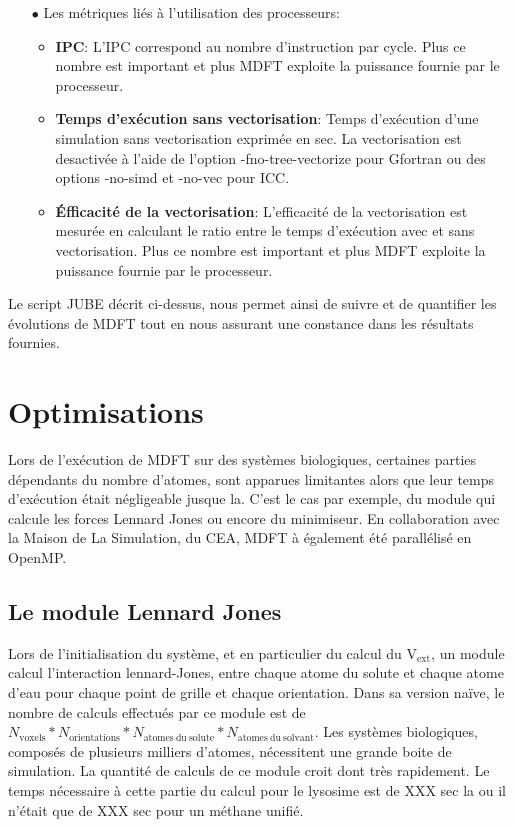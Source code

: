 \begin{itemize}
\item[$\bullet$] Les métriques liés à l'utilisation des processeurs:
  \begin{itemize}
  \item \textbf{IPC}: L'IPC correspond au nombre d'instruction par cycle. Plus ce nombre est important et plus MDFT exploite la puissance fournie par le processeur.
  \item \textbf{Temps d'exécution sans vectorisation}: Temps d’exécution d'une simulation sans vectorisation exprimée en sec. La vectorisation est desactivée à l'aide de l'option -fno-tree-vectorize pour Gfortran ou des options -no-simd et -no-vec pour ICC. 
  \item \textbf{\'Efficacité de la vectorisation}: L'efficacité de la vectorisation est mesurée en calculant le ratio entre le temps d'exécution avec et sans vectorisation. Plus ce nombre est important et plus MDFT exploite la puissance fournie par le processeur.
  \end{itemize}
  \vspace*{1.5ex}%

\end{itemize}

Le script JUBE décrit ci-dessus, nous permet ainsi de suivre et de quantifier les évolutions de MDFT tout en nous assurant une constance dans les résultats fournies.



\section{Optimisations}
Lors de l'exécution de MDFT sur des systèmes biologiques, certaines parties dépendants du nombre d'atomes, sont apparues limitantes alors que leur temps d'exécution était négligeable jusque la. C'est le cas par exemple, du module qui calcule les forces Lennard Jones ou encore du minimiseur. En collaboration avec la Maison de La Simulation, du CEA, MDFT à également été parallélisé en OpenMP.


\subsection{Le module Lennard Jones}
Lors de l’initialisation du système, et en particulier du calcul du $\mathrm{V}_\mathrm{ext}$, un module calcul l’interaction lennard-Jones, entre chaque atome du solute et chaque atome d'eau pour chaque point de grille et chaque orientation. Dans sa version naïve, le nombre de calculs effectués par ce module est de $N_{\mathrm{voxels}}*N_{\mathrm{orientations}}*N_{\mathrm{atomes\ du\ solute}}*N_{\mathrm{atomes\ du\ solvant}}$. Les systèmes biologiques, composés de plusieurs milliers d'atomes, nécessitent une grande boite de simulation. La quantité de calculs de ce module croit dont très rapidement.
Le temps nécessaire à cette partie du calcul pour le lysosime est de XXX sec la ou il n'était que de XXX sec pour un méthane unifié.

